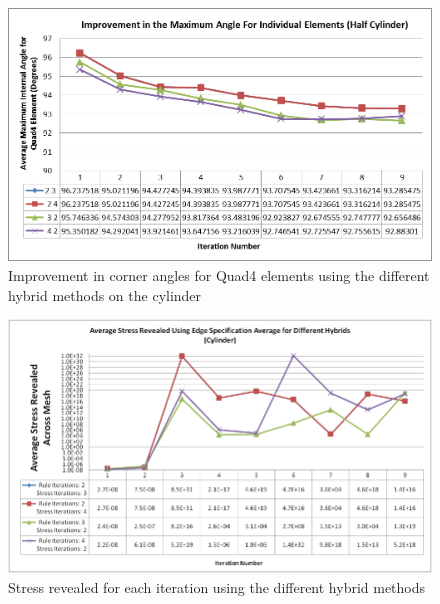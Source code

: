 \begin{figure}[H]
  \centerline{\includegraphics[width=120mm, scale=0.5]{../Graphics/HalfCylinder/ImprovementInMaxCornerAngles.png}}
  \caption{Improvement in corner angles for Quad4 elements using the different hybrid methods on the cylinder}
\end{figure}

\begin{figure}[H]
  \centerline{\includegraphics[width=120mm, scale=0.5]{../Graphics/FinalReportGraphs/AverageStressRevealedCylinder.png}}
  \caption{Stress revealed for each iteration using the different hybrid methods}
\end{figure}

